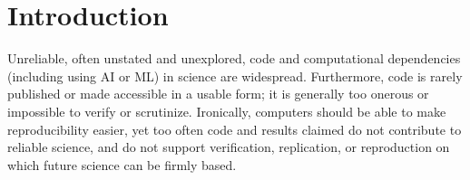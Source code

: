 \documentclass{comjnl}
\begin{document}
%


\section{Introduction}
Unreliable, often unstated and unexplored, code and computational dependencies (including using AI or ML) in science are widespread. Furthermore, code is rarely published or made accessible in a usable form; it is generally too onerous or impossible to verify or scrutinize. Ironically, computers should be able to make reproducibility easier, yet too often code and results claimed do not contribute to reliable science, and do not support verification, replication, or reproduction on which future science can be firmly based. 
\end{document}
